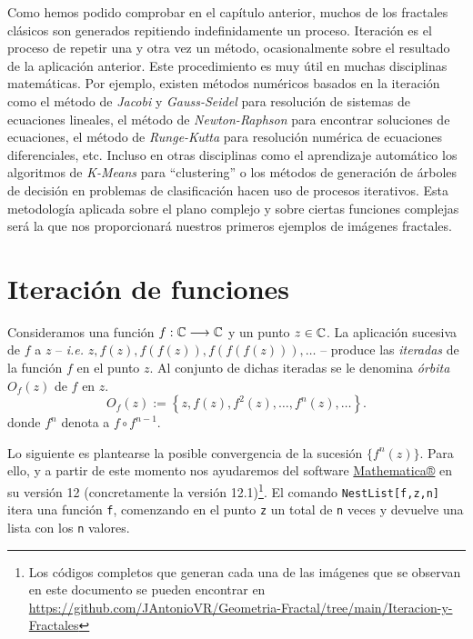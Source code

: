 
Como hemos podido comprobar en el capítulo anterior, muchos de los fractales clásicos son generados repitiendo indefinidamente un proceso. Iteración es el proceso de repetir una y otra vez un método, ocasionalmente sobre el resultado de la aplicación anterior. Este procedimiento es muy útil en muchas disciplinas matemáticas. Por ejemplo, existen métodos numéricos basados en la iteración como el método de \textit{Jacobi} y \textit{Gauss-Seidel} para resolución de sistemas de ecuaciones lineales, el método de \textit{Newton-Raphson} para encontrar soluciones de ecuaciones, el método de \textit{Runge-Kutta} para resolución numérica de ecuaciones diferenciales, etc. Incluso en otras disciplinas como el aprendizaje automático los algoritmos de \textit{K-Means} para ``clustering'' o los métodos de generación de árboles de decisión en problemas de clasificación hacen uso de procesos iterativos. Esta metodología aplicada sobre el plano complejo y sobre ciertas funciones complejas será la que nos proporcionará nuestros primeros ejemplos de imágenes fractales.

\section{Iteración de funciones}
\begin{definicion}
    Consideramos una función $f:\mathbb{C}\longrightarrow\mathbb{C}$ y un punto $z\in\mathbb{C}$. La aplicación sucesiva de $f$ a $z$ -- \textit{i.e.} $z,f(z),f(f(z)), f(f(f(z))),\dots$ -- produce las \textit{iteradas} de la función $f$ en el punto $z$. Al conjunto de dichas iteradas se le denomina \textit{órbita} $O_f(z)$ de $f$ en $z$.
    $$
    O_f(z):=\left\lbrace z, f(z), f^2(z), \dots, f^n(z), \dots\right\rbrace.
    $$
    donde $f^n$ denota a $f\circ f^{n-1}$.
\end{definicion}

Lo siguiente es plantearse la posible convergencia de la sucesión $\{f^n(z)\}$. Para ello, y a partir de este momento nos ayudaremos del software \textcolor{blue}{\href{https://www.wolfram.com/mathematica/}{Mathematica®}} en su versión 12 (concretamente la versión 12.1)\footnote{Los códigos completos que generan cada una de las imágenes que se observan en este documento se pueden encontrar en \url{https://github.com/JAntonioVR/Geometria-Fractal/tree/main/Iteracion-y-Fractales}}. El comando \verb|NestList[f,z,n]| itera una función \verb|f|, comenzando en el punto \verb|z| un total de \verb|n| veces y devuelve una lista con los \verb|n| valores. 

